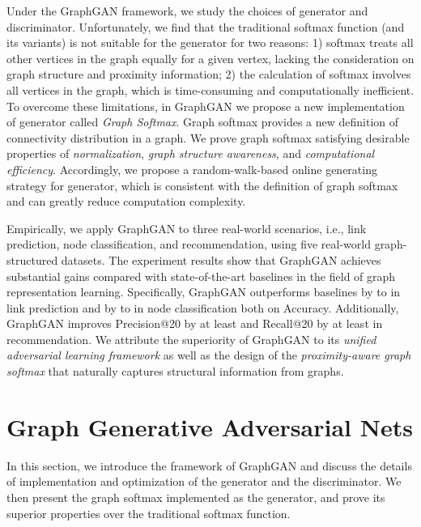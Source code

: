 \documentclass[letterpaper]{article}
\begin{document}
	Under the GraphGAN framework, we study the choices of generator and discriminator.
	Unfortunately, we find that the traditional softmax function (and its variants) is not suitable for the generator for two reasons:
	1) softmax treats all other vertices in the graph equally for a given vertex, lacking the consideration on graph structure and proximity information;
	2) the calculation of softmax involves all vertices in the graph, which is time-consuming and computationally inefficient.
	To overcome these limitations, in GraphGAN we propose a new implementation of generator called \textit{Graph Softmax}.
	Graph softmax provides a new definition of connectivity distribution in a graph.
	We prove graph softmax satisfying desirable properties of \textit{normalization}, \textit{graph structure awareness}, and \textit{computational efficiency}.
	Accordingly, we propose a random-walk-based online generating strategy for generator, which is consistent with the definition of graph softmax and can greatly reduce computation complexity.
	
	Empirically, we apply GraphGAN to three real-world scenarios, i.e., link prediction, node classification, and recommendation, using five real-world graph-structured datasets.
	The experiment results show that GraphGAN achieves substantial gains compared with state-of-the-art baselines in the field of graph representation learning.
	Specifically, GraphGAN outperforms baselines by  to  in link prediction and by  to  in node classification both on Accuracy.
	Additionally, GraphGAN improves Precision@20 by at least  and Recall@20 by at least  in recommendation.
	We attribute the superiority of GraphGAN to its \textit{unified adversarial learning framework} as well as the design of the \textit{proximity-aware graph softmax} that naturally captures structural information from graphs.
	
	
	
\section{Graph Generative Adversarial Nets}
	In this section, we introduce the framework of GraphGAN and discuss the details of implementation and optimization of the generator and the discriminator.
	We then present the graph softmax implemented as the generator, and prove its superior properties over the traditional softmax function.
	
	
\end{document}
